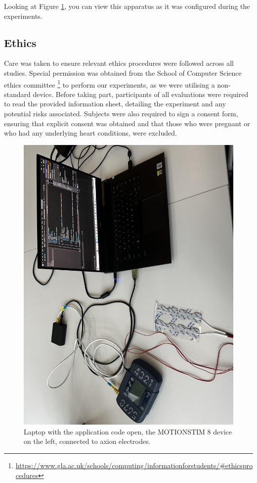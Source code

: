\documentclass{mpaper}
\begin{document}
Looking at Figure \ref{fig:apparatus}, you can view this apparatus as it was configured during the experiments.

\subsection{Ethics} \label{ethics}
Care was taken to ensure relevant ethics procedures were followed across all studies. Special permission was obtained from the School of Computer Science ethics committee \footnote{\url{https://www.gla.ac.uk/schools/computing/informationforstudents/\#ethicsprocedures}} to perform our experiments, as we were utilising a non-standard device. Before taking part, participants of all evaluations were required to read the provided information sheet, detailing the experiment and any potential risks associated. Subjects were also required to sign a consent form, ensuring that explicit consent was obtained and that those who were pregnant or who had any underlying heart conditions, were excluded.

\begin{figure}
    \centering
    \includegraphics[scale=0.23, angle=180]{images/IMG_5137.JPG}
    \caption{Laptop with the application code open, the MOTIONSTIM 8 device on the left, connected to axion electrodes.}
    \label{fig:apparatus}
\end{figure}
\end{document}
